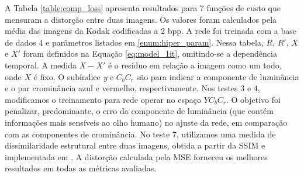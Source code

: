 





A Tabela \ref{table:comp_loss} apresenta resultados para 7 funções de custo que mensuram a distorção entre duas imagens.  Os valores foram calculados pela média das imagens da Kodak codificadas a 2 bpp. A rede foi treinada com a base de dados 4 e parâmetros listados em	\ref{enum:hiper_param}. Nessa tabela, $R$, $R'$, $X$ e $X'$ foram definidos na Equação \ref{eq:model_1it}, omitindo-se a dependência temporal. A medida $X-X'$ é o resíduo em relação a imagem como um todo, onde $X$ é fixo.  
O subíndice \textit{y} e \textit{$C_bC_r$} são para indicar a componente de luminância e o par crominância azul e vermelho, respectivamente. Nos testes 3 e 4, modificamos o treinamento para rede operar no espaço $YC_bC_r$. O objetivo foi penalizar, predominante, o erro da componente de luminância (que contém informações mais sensíveis ao olho humano) no ajuste da rede, em comparação com as componentes de crominância.
No teste 7, utilizamos uma medida de dissimilaridade estrutural entre duas imagens, obtida a partir da SSIM e implementada em \cite{su2017}.  A distorção calculada pela MSE forneceu os melhores resultados em todas as métricas avaliadas. 


